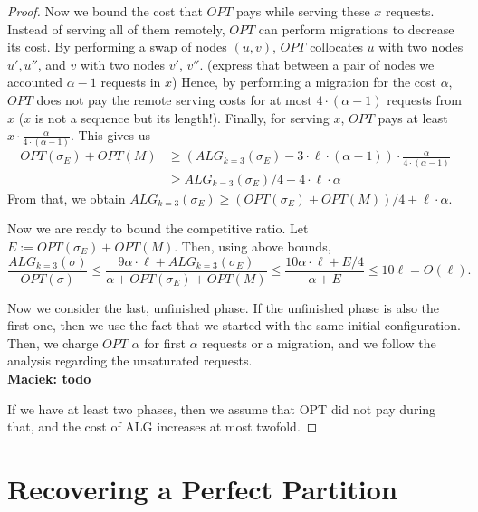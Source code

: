 \documentclass[manuscript,screen=true]{acmart}
\newcommand{\OPT}{\mathit{OPT}}
\newcommand{\PPOBRP}{PP-BRP}
\newcommand{\TAlg}{{\ensuremath{ALG_{k=3}}}\xspace} %
\newcommand\mahmoud[1]{\color{green}\textbf{\\ Mahmoud: #1}\\\color{black}}
\newcommand\maciek[1]{\color{brown}\textbf{\\ Maciek: #1}\color{black}}
\begin{document}
\begin{proof}
  Now we bound the cost that $\OPT$ pays while serving these $x$ requests.
  Instead of serving all of them remotely, $\OPT$ can perform migrations to decrease its cost.
  By performing a swap of nodes $(u,v)$, $\OPT$ collocates $u$ with two nodes $u', u''$, and $v$ with two nodes $v'$, $v''$.
  (express that between a pair of nodes we accounted $\alpha-1$ requests in $x$)
  Hence, by performing a migration for the cost $\alpha$, $\OPT$ does not pay the remote serving costs for at most $4\cdot (\alpha - 1)$ requests from $x$ ($x$ is not a sequence but its length!).
  Finally, for serving $x$, $\OPT$ pays at least $x \cdot \frac{\alpha}{4\cdot (\alpha-1)}$.
  This gives us
  \begin{align*}
    \OPT(\sigma_E) + \OPT(M) & \geq (\TAlg(\sigma_E)-3\cdot\ell\cdot(\alpha - 1)) \cdot \frac{\alpha}{4\cdot (\alpha-1)}\\
    &\geq \TAlg(\sigma_E) / 4 - 4\cdot \ell \cdot \alpha
  \end{align*}
  From that, we obtain $\TAlg(\sigma_E) \geq (\OPT(\sigma_E)+\OPT(M))/4 + \ell \cdot \alpha$.

  Now we are ready to bound the competitive ratio.
  Let $E := \OPT(\sigma_E) + \OPT(M)$. Then, using above bounds,
  \begin{equation*}
    \frac{\TAlg(\sigma)}{\OPT(\sigma)} \leq \frac{9\alpha \cdot \ell + \TAlg(\sigma_E)}{\alpha + \OPT(\sigma_E) + \OPT(M)} \leq \frac{10\alpha\cdot\ell + E/4}{\alpha + E} \leq 10 \ell = O(\ell).
  \end{equation*}

  \medskip

  Now we consider the last, unfinished phase.
  If the unfinished phase is also the first one, then we use the fact that we started with the same initial configuration.
  Then, we charge $\OPT$ $\alpha$ for first $\alpha$ requests or a migration,
  and we follow the analysis regarding the unsaturated requests.
  \maciek{todo}

  If we have at least two phases, then we assume that OPT did not pay during that, and the cost of ALG increases at most twofold.
\end{proof}


\section{Recovering a Perfect Partition}	\label{sec:ppl}
\end{document}

